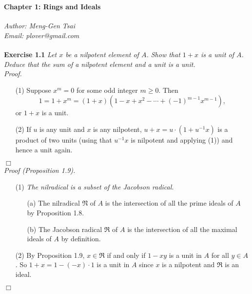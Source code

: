 \documentclass{article}
\begin{document}
\textbf{\Large Chapter 1: Rings and Ideals} \\\\



\emph{Author: Meng-Gen Tsai} \\
\emph{Email: plover@gmail.com} \\\\






\textbf{Exercise 1.1}
\emph{Let $x$ be a nilpotent element of $A$.
Show that $1+x$ is a unit of $A$.
Deduce that the sum of a nilpotent element and a unit is a unit.} \\

\emph{Proof.}
\begin{enumerate}
\item[(1)]
Suppose $x^m = 0$ for some odd integer $m \geq 0$.
Then
$$1 = 1+x^m = (1+x)(1-x+x^2-\cdots+(-1)^{m-1}x^{m-1}),$$
or $1+x$ is a unit.
\item[(2)]
If $u$ is any unit and $x$ is any nilpotent,
$u + x= u \cdot (1 + u^{-1}x)$ is a product of two units
(using that $u^{-1}x$ is nilpotent and applying (1))
and hence a unit again.
\end{enumerate}
$\Box$ \\

\emph{Proof (Proposition 1.9).}
\begin{enumerate}
\item[(1)]
\emph{The nilradical is a subset of the Jacobson radical.}
\begin{enumerate}
\item[(a)]
The nilradical $\mathfrak{N}$ of $A$ is the intersection of all the prime ideals of $A$
by Proposition 1.8.
\item[(b)]
The Jacobson radical $\mathfrak{R}$ of $A$ is the intersection of all the maximal ideals of $A$
by definition.
\end{enumerate}
\item[(2)]
By Proposition 1.9,
$x \in \mathfrak{R}$ if and only if
$1-xy$ is a unit in $A$ for all $y \in A$.
So $1+x = 1 - (-x) \cdot 1$ is a unit in $A$
since $x$ is a nilpotent and $\mathfrak{R}$ is an ideal.
\end{enumerate}
$\Box$ \\\\
\end{document}
